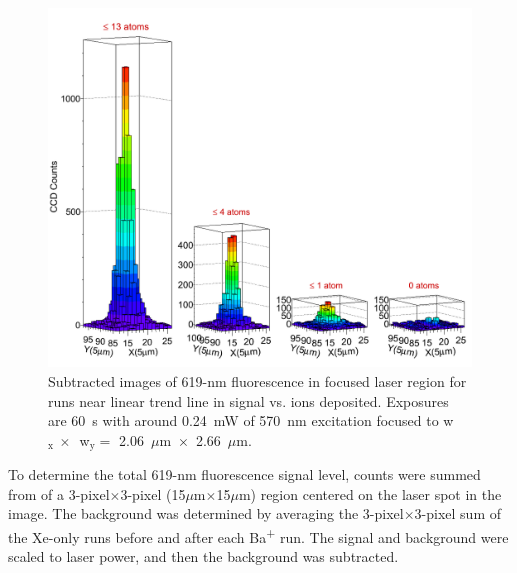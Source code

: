 \begin{figure} %
        \centering
                \includegraphics[width=.99\textwidth]{figures/train.png}
                \caption{Subtracted images of 619-nm fluorescence in focused laser region for runs near linear trend line in signal vs. ions deposited.  Exposures are 60~s with around 0.24~mW of 570~nm excitation focused to w$_{\text{x}}~\times$~w$_{\text{y}} =$ 2.06~$\mu$m~$\times$~2.66~$\mu$m.}
\label{fig:train}
\end{figure}

To determine the total 619-nm fluorescence signal level, counts were summed from of a 3-pixel$\times$3-pixel (15$\mu$m$\times$15$\mu$m) region centered on the laser spot in the image.  The background was determined by averaging the 3-pixel$\times$3-pixel sum of the Xe-only runs before and after each Ba\textsuperscript{+} run.  The signal and background were scaled to laser power, and then the background was subtracted.

